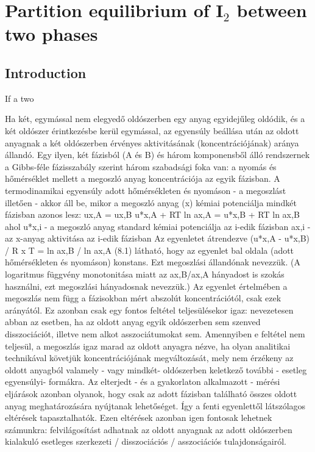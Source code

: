 \section{Partition equilibrium of I$_2$ between two phases}
\subsection{Introduction}
If a two

Ha két, egymással nem elegyedő oldószerben egy anyag egyidejűleg oldódik, és a két oldószer érintkezésbe kerül egymással, az egyensúly beállása után az oldott anyagnak a két oldószerben érvényes aktivitásának (koncentrációjának) aránya állandó.
Egy ilyen, két fázisból (A és B) és három komponensből álló rendszernek a Gibbs-féle fázisszabály szerint három szabadsági foka van: a nyomás és hőmérséklet mellett a megoszló anyag koncentrációja az egyik fázisban.
A termodinamikai egyensúly adott hőmérsékleten és nyomáson - a megoszlást illetően - akkor áll be, mikor a megoszló anyag (x) kémiai potenciálja mindkét fázisban azonos lesz:
ux,A = ux,B
u*x,A + RT ln ax,A = u*x,B + RT ln ax,B
ahol u*x,i - a megoszló anyag standard kémiai potenciálja az i-edik fázisban
ax,i - az x-anyag aktivitása az i-edik fázisban
Az egyenletet átrendezve
(u*x,A - u*x,B) / R x T = ln ax,B / ln ax,A                (8.1)
látható, hogy az egyenlet bal oldala (adott hőmérsékleten és nyomáson) konstans.
Ezt megoszlási állandónak nevezzük.
(A logaritmus függvény monotonitása miatt az ax,B/ax,A hányadost is szokás használni, ezt megoszlási hányadosnak nevezzük.)
Az egyenlet értelmében a megoszlás nem függ a fázisokban mért abszolút koncentrációtól, csak ezek arányától.
Ez azonban csak egy fontos feltétel teljesülésekor igaz: nevezetesen abban az esetben, ha az oldott anyag egyik oldószerben sem szenved disszociációt, illetve nem alkot asszociátumokat sem.
Amennyiben e feltétel nem teljesül, a megoszlás igaz marad az oldott anyagra nézve, ha olyan analitikai technikával követjük koncentrációjának megváltozását, mely nem érzékeny az oldott anyagból valamely - vagy mindkét- oldószerben keletkező további - esetleg egyensúlyi- formákra.
Az elterjedt - és a gyakorlaton alkalmazott - mérési eljárások azonban olyanok, hogy csak az adott fázisban található összes oldott anyag meghatározására nyújtanak lehetőséget.
Így a fenti egyenlettől látszólagos eltérések tapasztalhatók.
Ezen eltérések azonban igen fontosak lehetnek számunkra: felvilágosítást adhatnak az oldott anyagnak az adott oldószerben kialakuló esetleges szerkezeti / disszociációs / asszociációs tulajdonságairól.
